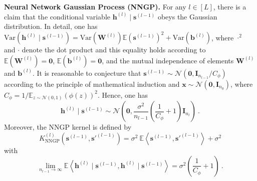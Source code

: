 \documentclass[review,10pt]{JMtemplate}
\begin{document}
\vspace{0.2 cm}
\noindent\textbf{Neural Network Gaussian Process (NNGP).} For any $l \in [L]$, there is a claim that the conditional variable $\boldsymbol{h}^{(l)} \mid 	\boldsymbol{s}^{(l-1)}$ obeys the Gaussian distribution. In detail, one has $\textrm{Var} ( \boldsymbol{h}^{(l)} \mid	\boldsymbol{s}^{(l-1)} ) = \textrm{Var} ( \mathbf{W}^{(l)}) \mathbb{E} ( \boldsymbol{s}^{(l-1)} )^2 + \textrm{Var} (  \boldsymbol{b}^{(l)} )$, where $\cdot^2$ and $\cdot$ denote the dot product and this equality holds according to $\mathbb{E} ( \mathbf{W}^{(l)} ) = \mathbf{0}$, $\mathbb{E}( \boldsymbol{b}^{(l)} ) = \boldsymbol{0} $, and the mutual independence of elements $\mathbf{W}^{(l)}$ and $\boldsymbol{b}^{(l)}$. It is reasonable to conjecture that $\boldsymbol{s}^{(l-1)} \sim \mathcal{N}(\boldsymbol{0}, \mathbf{I}_{n_{l-1}} / C_{\phi})$ according to the principle of mathematical induction and $\boldsymbol{x} \sim \mathcal{N}(\boldsymbol{0}, \mathbf{I}_{n_0})$, where $C_{\phi} = {1}/{\mathbb{E}_{z \sim \mathcal{N}(0,1)} \left( \phi(z) \right)^2 }$. Hence, one has
\[
\boldsymbol{h}^{(l)} \mid	\boldsymbol{s}^{(l-1)}  \sim \mathcal{N} \left(  \boldsymbol{0}, \frac{\sigma^2}{n_{l-1}} \left( \frac{1}{C_{\phi}} + 1 \right) \mathbf{I}_{n_l} \right) \ .
\]
Moreover, the NNGP kernel is defined by
\[
K_{\textrm{NNGP}}^{(l)} \left( \boldsymbol{s}^{(l-1)}, \boldsymbol{s}'^{(l-1)} \right) 	= \sigma^2 ~\mathbb{E} \left\langle\boldsymbol{s}^{(l-1)},  \boldsymbol{s}'^{(l-1)}  \right\rangle + \sigma^2
\]
with
\[
\lim\limits_{n_{l-1} \to \infty} \mathbb{E} \left\langle \boldsymbol{h}^{(l)} \mid	\boldsymbol{s}^{(l-1)}, \boldsymbol{h}^{(l)} \mid \boldsymbol{s}^{(l-1)}  \right\rangle =  \sigma^2 \left( \frac{1}{C_{\phi}} + 1 \right) \ .
\]
\end{document}
